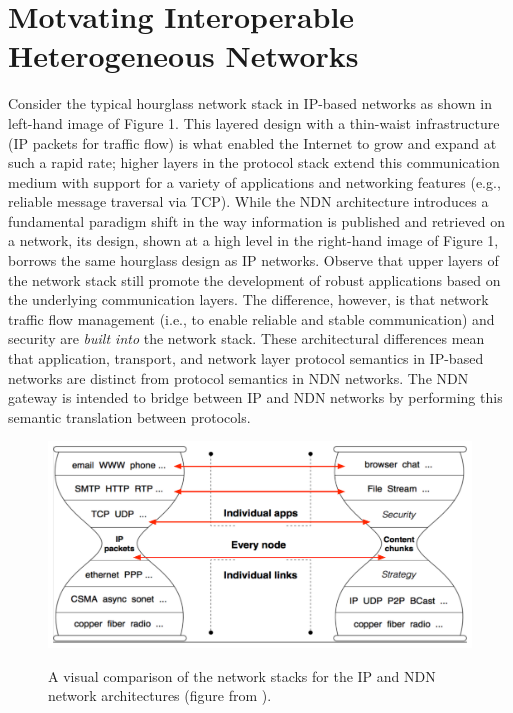 \section{Motvating Interoperable Heterogeneous Networks}
Consider the typical hourglass network stack in IP-based networks as shown in left-hand image of Figure 1. This layered design with a thin-waist infrastructure (IP packets for traffic flow) is what enabled the Internet to grow and expand at such a rapid rate; higher layers in the protocol stack extend this communication medium with support for a variety of applications and networking features (e.g., reliable message traversal via TCP). While the NDN architecture introduces a fundamental paradigm shift in the way information is published and retrieved on a network, its design, shown at a high level in the right-hand image of Figure 1, borrows the same hourglass design as IP networks. Observe that upper layers of the network stack still promote the development of robust applications based on the underlying communication layers. The difference, however, is that network traffic flow management (i.e., to enable reliable and stable communication) and security are \emph{built into} the network stack. These architectural differences mean that application, transport, and network layer protocol semantics in IP-based networks are distinct from protocol semantics in NDN networks. The NDN gateway is intended to bridge between IP and NDN networks by performing this semantic translation between protocols. 

\begin{figure}[ht!]
\begin{center}
\includegraphics[scale=0.32]{./images/hourglass_conn.pdf}
\label{fig:hourglass}
\caption{A visual comparison of the network stacks for the IP and NDN network architectures (figure from \cite{ndn-techreport}).}
\end{center}
\end{figure}

